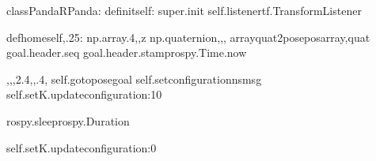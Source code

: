 \documentclass[letterpaper,10pt,english]{sphinxmanual}
\begin{document}
\begin{sphinxVerbatim}[commandchars=\\\{\}]
classPanda\PYGZus{}RPanda:
def\PYGZus{}\PYGZus{}init\PYGZus{}\PYGZus{}self:
super.\PYGZus{}\PYGZus{}init\PYGZus{}\PYGZus{}
self.listenertf.TransformListener

defhomeself,.25:
np.array\PYG{o}{[}.4,,z\PYG{o}{]}
np.quaternion,,,
array\PYGZus{}quat\PYGZus{}2\PYGZus{}posepos\PYGZus{}array,quat
goal.header.seq
goal.header.stamprospy.Time.now

\PYG{o}{[},,,\PYGZhy{}2.4,,.4,\PYG{o}{]}
self.go\PYGZus{}to\PYGZus{}posegoal
self.set\PYGZus{}configurationns\PYGZus{}msg
self.set\PYGZus{}K.update\PYGZus{}configuration:10

rospy.sleeprospy.Duration

self.set\PYGZus{}K.update\PYGZus{}configuration:0
\end{sphinxVerbatim}
\end{document}
